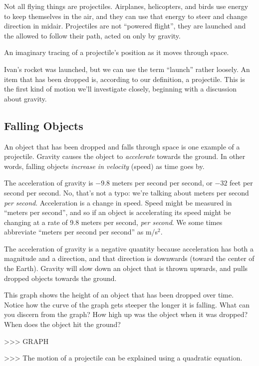 Not all flying things are projectiles. Airplanes, helicopters, and birds use energy to keep themselves in the air, and they can use that energy to steer and change direction in midair. Projectiles are not ``powered flight'', they are launched and the allowed to follow their path, acted on only by gravity.

\begin{boxeddef}[Trajectory]
An imaginary tracing of a projectile's position as it moves through space.
\end{boxeddef}

Ivan's rocket was launched, but we can use the term ``launch'' rather loosely. An item that has been dropped is, according to our definition, a projectile. This is the first kind of motion we'll investigate closely, beginning with a discussion about gravity.

\subsection{Falling Objects}

An object that has been dropped and falls through space is one example of a projectile. Gravity causes the object to \textit{accelerate} towards the ground. In other words, falling objects \textit{increase in velocity} (speed) as time goes by.

The acceleration of gravity is $-9.8$ meters per second per second, or $-32$ feet per second per second. No, that's not a typo: we're talking about meters per second \textit{per second}. Acceleration is a change in speed. Speed might be measured in ``meters per second'', and so if an object is accelerating its speed might be changing at a rate of 9.8 meters per second, \textit{per second}. We some times abbreviate ``meters per second per second'' as m/s$^2$.

The acceleration of gravity is a negative quantity because acceleration has both a magnitude and a direction, and that direction is downwards (toward the center of the Earth). Gravity will slow down an object that is thrown upwards, and pulls dropped objects towards the ground.

This graph shows the height of an object that has been dropped over time. Notice how the curve of the graph gets steeper the longer it is falling. What can you discern from the graph? How high up was the object when it was dropped? When does the object hit the ground?

>>> GRAPH

>>> The motion of a projectile can be explained using a quadratic equation.

